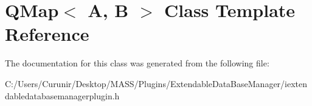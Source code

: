 \hypertarget{class_q_map}{}\section{Q\+Map$<$ A, B $>$ Class Template Reference}
\label{class_q_map}


The documentation for this class was generated from the following file\+:\begin{DoxyCompactItemize}
\item 
C\+:/\+Users/\+Curunir/\+Desktop/\+M\+A\+S\+S/\+Plugins/\+Extendable\+Data\+Base\+Manager/iextendabledatabasemanagerplugin.\+h\end{DoxyCompactItemize}
